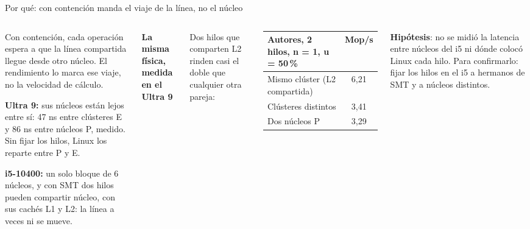 \begin{frame}{Por qué: con contención manda el viaje de la línea, no el núcleo}
  \begin{columns}[T,onlytextwidth]
    \begin{porque}
      Con contención, cada operación espera a que la línea compartida llegue desde otro núcleo. El rendimiento lo marca ese viaje, no la velocidad de cálculo.\par\vspace{1.5mm}
      \textbf{Ultra 9:} sus núcleos están lejos entre sí: 47 ns entre clústeres E y 86 ns entre núcleos P, medido. Sin fijar los hilos, Linux los reparte entre P y E.\par\vspace{1.5mm}
      \textbf{i5-10400:} un solo bloque de 6 núcleos, y con SMT dos hilos pueden compartir núcleo, con sus cachés L1 y L2: la línea a veces ni se mueve.
    \end{porque}
    \small\textbf{\color{marino}La misma física, medida en el Ultra 9}\par\vspace{1mm}
    \footnotesize Dos hilos que comparten L2 rinden casi el doble que cualquier otra pareja:\par\vspace{1mm}
    \begin{tabular}{@{}lc@{}}
      \toprule
      \textbf{Autores, 2 hilos, n = 1, u = 50\,\%} & \textbf{Mop/s}\\
      \midrule
      Mismo clúster (L2 compartida) & 6,21\\
      Clústeres distintos & 3,41\\
      Dos núcleos P & 3,29\\
      \bottomrule
    \end{tabular}\par\vspace{2mm}
    \begin{ojo}\textbf{Hipótesis}: no se midió la latencia entre núcleos del i5 ni dónde colocó Linux cada hilo. Para confirmarlo: fijar los hilos en el i5 a hermanos de SMT y a núcleos distintos.\end{ojo}
  \end{columns}
\end{frame}
